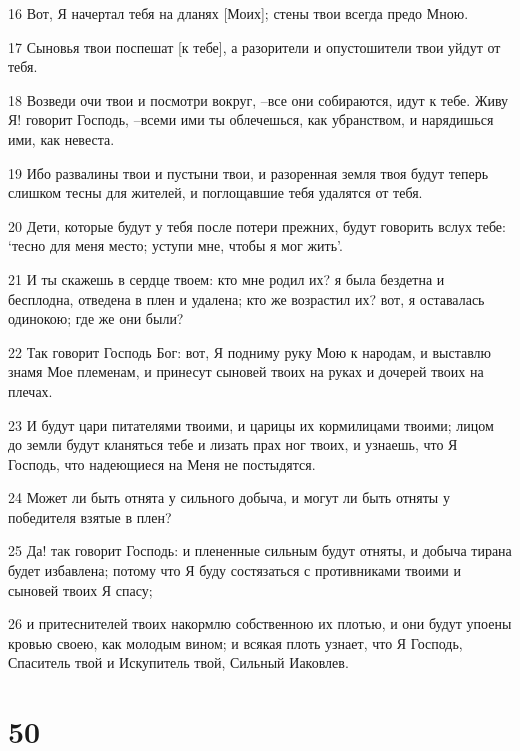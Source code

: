 \par 16 Вот, Я начертал тебя на дланях [Моих]; стены твои всегда предо Мною.
\par 17 Сыновья твои поспешат [к тебе], а разорители и опустошители твои уйдут от тебя.
\par 18 Возведи очи твои и посмотри вокруг, --все они собираются, идут к тебе. Живу Я! говорит Господь, --всеми ими ты облечешься, как убранством, и нарядишься ими, как невеста.
\par 19 Ибо развалины твои и пустыни твои, и разоренная земля твоя будут теперь слишком тесны для жителей, и поглощавшие тебя удалятся от тебя.
\par 20 Дети, которые будут у тебя после потери прежних, будут говорить вслух тебе: `тесно для меня место; уступи мне, чтобы я мог жить'.
\par 21 И ты скажешь в сердце твоем: кто мне родил их? я была бездетна и бесплодна, отведена в плен и удалена; кто же возрастил их? вот, я оставалась одинокою; где же они были?
\par 22 Так говорит Господь Бог: вот, Я подниму руку Мою к народам, и выставлю знамя Мое племенам, и принесут сыновей твоих на руках и дочерей твоих на плечах.
\par 23 И будут цари питателями твоими, и царицы их кормилицами твоими; лицом до земли будут кланяться тебе и лизать прах ног твоих, и узнаешь, что Я Господь, что надеющиеся на Меня не постыдятся.
\par 24 Может ли быть отнята у сильного добыча, и могут ли быть отняты у победителя взятые в плен?
\par 25 Да! так говорит Господь: и плененные сильным будут отняты, и добыча тирана будет избавлена; потому что Я буду состязаться с противниками твоими и сыновей твоих Я спасу;
\par 26 и притеснителей твоих накормлю собственною их плотью, и они будут упоены кровью своею, как молодым вином; и всякая плоть узнает, что Я Господь, Спаситель твой и Искупитель твой, Сильный Иаковлев.

\chapter{50}

